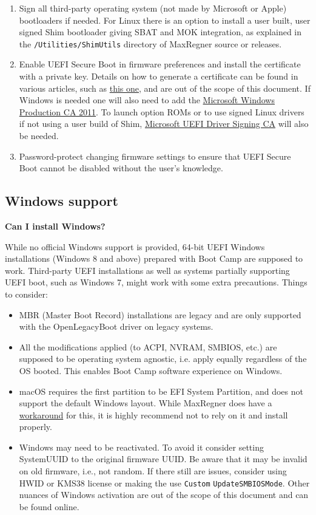 \documentclass[]{article}
\begin{document}
\begin{enumerate}
\item Sign all third-party operating system (not made by Microsoft or Apple)
  bootloaders if needed. For Linux there is an option to install
  a user built, user signed Shim bootloader giving SBAT and MOK integration,
  as explained in the \texttt{/Utilities/ShimUtils} directory of MaxRegner
  source or releases.
\item Enable UEFI Secure Boot in firmware preferences and install the
  certificate with a private key. Details on how to generate a certificate
  can be found in various articles, such as \href{https://habr.com/en/post/273497}{this one},
  and are out of the scope of this document. If Windows is needed one
  will also need to add the
  \href{http://go.microsoft.com/fwlink/?LinkID=321192}{Microsoft Windows Production CA 2011}.
  To launch option ROMs or to use signed Linux drivers if not using a user build of Shim,
  \href{http://go.microsoft.com/fwlink/?LinkId=321194}{Microsoft UEFI Driver Signing CA} will also be needed.
\item Password-protect changing firmware settings to ensure that UEFI Secure Boot
  cannot be disabled without the user's knowledge.
\end{enumerate}

\subsection{Windows support}\label{troubleshootingwin}

  \textbf{Can I install Windows?}

  While no official Windows support is provided, 64-bit UEFI Windows installations (Windows 8 and
  above) prepared with Boot Camp are supposed to work. Third-party UEFI installations
  as well as systems partially supporting UEFI boot, such as Windows 7, might work with
  some extra precautions. Things to consider:

  \begin{itemize}
  \item MBR (Master Boot Record) installations are legacy and are only supported
  with the OpenLegacyBoot driver on legacy systems.
  \item All the modifications applied (to ACPI, NVRAM, SMBIOS, etc.) are supposed
  to be operating system agnostic, i.e. apply equally regardless of the OS booted.
  This enables Boot Camp software experience on Windows.
  \item macOS requires the first partition to be EFI System Partition, and does
  not support the default Windows layout. While MaxRegner does have a
  \href{https://github.com/acidanthera/bugtracker/issues/327}{workaround}
  for this, it is highly recommend not to rely on it and install properly.
  \item Windows may need to be reactivated. To avoid it consider
  setting SystemUUID to the original firmware UUID. Be aware that it may be invalid
  on old firmware, i.e., not random. If there still are issues,
  consider using HWID or KMS38 license or making the use \texttt{Custom}
  \texttt{UpdateSMBIOSMode}. Other nuances of Windows activation are out of the
  scope of this document and can be found online.
  \end{itemize}
\end{document}
